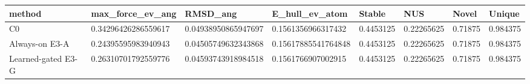 \begin{tabular}{llllllll}
\toprule
method & max\_force\_ev\_ang & RMSD\_ang & E\_hull\_ev\_atom & Stable & NUS & Novel & Unique \\
\midrule
C0 & 0.34296426286559617 & 0.04938950865947697 & 0.1561356966317432 & 0.4453125 & 0.22265625 & 0.71875 & 0.984375 \\
Always-on E3-A & 0.24395595983940943 & 0.04505749632343868 & 0.15617885541764848 & 0.4453125 & 0.22265625 & 0.71875 & 0.984375 \\
Learned-gated E3-G & 0.26310701792559776 & 0.04593743918984518 & 0.1561766907002915 & 0.4453125 & 0.22265625 & 0.71875 & 0.984375 \\
\bottomrule
\end{tabular}

